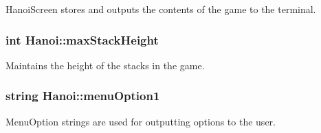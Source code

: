 Hanoi\-Screen stores and outputs the contents of the game to the terminal. 

\hypertarget{classHanoi_a826f3bc786cb5c7b6499508d0b8bc9b4}{
\subsubsection[{max\-Stack\-Height}]{\setlength{\rightskip}{0pt plus 5cm}int Hanoi\-::max\-Stack\-Height\hspace{0.3cm}{\ttfamily [private]}}}\label{classHanoi_a826f3bc786cb5c7b6499508d0b8bc9b4}


Maintains the height of the stacks in the game. 

\hypertarget{classHanoi_a9f971c51b287b61d8a919c26780e3f66}{
\subsubsection[{menu\-Option1}]{\setlength{\rightskip}{0pt plus 5cm}string Hanoi\-::menu\-Option1\hspace{0.3cm}{\ttfamily [private]}}}\label{classHanoi_a9f971c51b287b61d8a919c26780e3f66}


Menu\-Option strings are used for outputting options to the user. 

